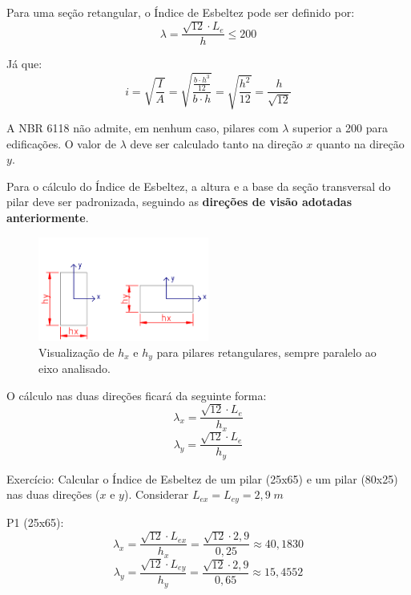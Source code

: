Para uma seção retangular, o Índice de Esbeltez pode ser definido por:
\begin{equation}\lambda=\frac{\sqrt{12}\cdot L_e}{h}\leqslant200\end{equation}

Já que: \begin{equation}i=\sqrt{\frac{I}{A}}=\sqrt{\frac{\frac{b\cdot h^3}{12}}{b\cdot h}}=\sqrt{\frac{h^2}{12}}=\frac{h}{\sqrt{12}}\end{equation}

A NBR 6118 não admite, em nenhum caso, pilares com $\lambda$ superior a 200 para edificações. O valor de $\lambda$ deve ser calculado tanto na direção $x$ quanto na direção $y$.

Para o cálculo do Índice de Esbeltez, a altura e a base da seção transversal do pilar deve ser padronizada, seguindo as \textbf{direções de visão adotadas anteriormente}.

\begin{figure}[H]
	\begin{center}
	\caption{Visualização de $h_x$ e $h_y$ para pilares retangulares, sempre paralelo ao eixo analisado.}
    	\includegraphics[width=0.5\textwidth]{Indice-de-esbeltez/Imagens/hx-e-hy-de-secao-transversal-pilar.png}
	\end{center}
\end{figure}

O cálculo nas duas direções ficará da seguinte forma:
\begin{equation}\lambda_x=\frac{\sqrt{12}\cdot L_e}{h_x}\end{equation}
\begin{equation}\lambda_y=\frac{\sqrt{12}\cdot L_e}{h_y}\end{equation}

Exercício: Calcular o Índice de Esbeltez de um pilar (25x65) e um pilar (80x25) nas duas direções ($x$ e $y$). Considerar $L_{ex}=L_{ey}=2,9\;m$

P1 (25x65):
$$\lambda_x=\frac{\sqrt{12}\cdot L_{ex}}{h_x}=\frac{\sqrt{12}\cdot2,9}{0,25}\approx40,1830$$
$$\lambda_y=\frac{\sqrt{12}\cdot L_{ey}}{h_y}=\frac{\sqrt{12}\cdot2,9}{0,65}\approx15,4552$$


